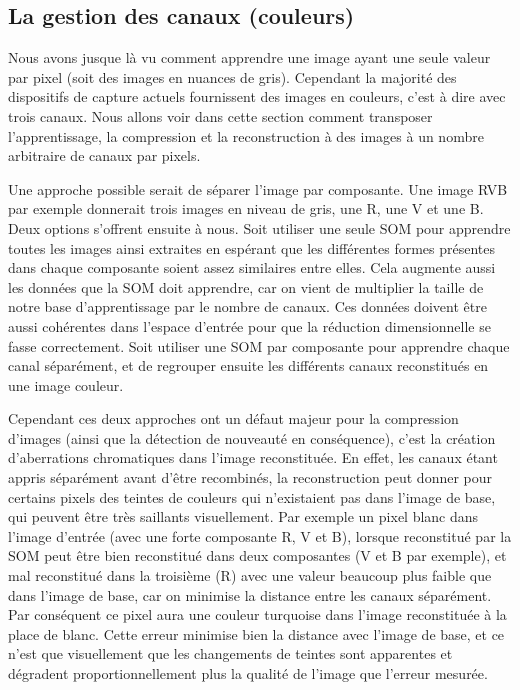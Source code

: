 	\subsection{La gestion des canaux (couleurs)}\label{sec:img:colors}

	Nous avons jusque là vu comment apprendre une image ayant une seule valeur par pixel (soit des images en nuances de gris). Cependant la majorité des dispositifs de capture actuels fournissent des images en couleurs, c'est à dire avec trois canaux. Nous allons voir dans cette section comment transposer l'apprentissage, la compression et la reconstruction à des images à un nombre arbitraire de canaux par pixels.

	Une approche possible serait de séparer l'image par composante. Une image RVB par exemple donnerait trois images en niveau de gris, une R, une V et une B. Deux options s'offrent ensuite à nous. Soit utiliser une seule SOM pour apprendre toutes les images ainsi extraites en espérant que les différentes formes présentes dans chaque composante soient assez similaires entre elles. Cela augmente aussi les données que la SOM doit apprendre, car on vient de multiplier la taille de notre base d'apprentissage par le nombre de canaux. Ces données doivent être aussi cohérentes dans l'espace d'entrée pour que la réduction dimensionnelle se fasse correctement. Soit utiliser une SOM par composante pour apprendre chaque canal séparément, et de regrouper ensuite les différents canaux reconstitués en une image couleur. 
	
	Cependant ces deux approches ont un défaut majeur pour la compression d'images (ainsi que la détection de nouveauté en conséquence), c'est la création d'aberrations chromatiques dans l'image reconstituée. En effet, les canaux étant appris séparément avant d'être recombinés, la reconstruction peut donner pour certains pixels des teintes de couleurs qui n'existaient pas dans l'image de base, qui peuvent être très saillants visuellement. Par exemple un pixel blanc dans l'image d'entrée (avec une forte composante R, V et B), lorsque reconstitué par la SOM peut être bien reconstitué dans deux composantes (V et B par exemple), et mal reconstitué dans la troisième (R) avec une valeur beaucoup plus faible que dans l'image de base, car on minimise la distance entre les canaux séparément. Par conséquent ce pixel aura une couleur turquoise dans l'image reconstituée à la place de blanc. Cette erreur minimise bien la distance avec l'image de base, et ce n'est que visuellement que les changements de teintes sont apparentes et dégradent proportionnellement plus la qualité de l'image que l'erreur mesurée.

